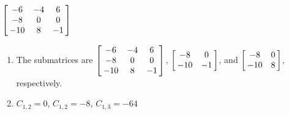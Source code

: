 {$\left[\hskip -3pt \begin{array}{ccc} -6&-4&6\\  -8&0&0
\\  -10&8&-1\end{array}\hskip -3pt \right] $} 
{\begin{enumerate}
\item The submatrices are 
$\left[\hskip -3pt \begin{array}{ccc} -6&-4&6\\  -8&0&0
\\  -10&8&-1\end{array}\hskip -3pt \right] $, 
 $\left[\hskip -3pt \begin{array}{cc} -8&0\\  -10&-1\end {array} \hskip -3pt
 \right]$, and 
 $\left[\hskip -3pt \begin{array}{cc} -8&0\\  -10&8\end {array} \hskip -3pt
 \right]$, respectively.
 \item	$C_{1,2}=0$, $C_{1,2}=-8$, $C_{1,3}=-64$
 \end{enumerate}
}

  

 

